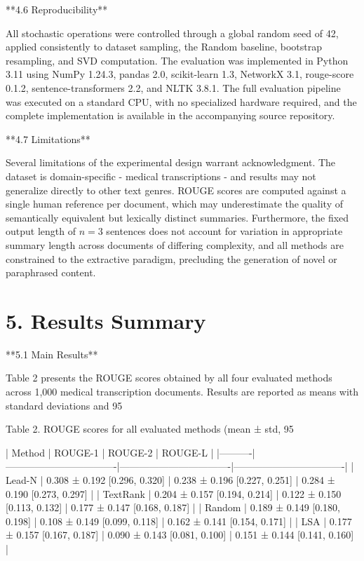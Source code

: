 \documentclass[10pt]{book}
\begin{document}
**4.6 Reproducibility**

All stochastic operations were controlled through a global random seed of 42, applied consistently to dataset sampling, the Random baseline, bootstrap resampling, and SVD computation. The evaluation was implemented in Python 3.11 using NumPy 1.24.3, pandas 2.0, scikit-learn 1.3, NetworkX 3.1, rouge-score 0.1.2, sentence-transformers 2.2, and NLTK 3.8.1. The full evaluation pipeline was executed on a standard CPU, with no specialized hardware required, and the complete implementation is available in the accompanying source repository.

**4.7 Limitations**

Several limitations of the experimental design warrant acknowledgment. The dataset is domain-specific - medical transcriptions - and results may not generalize directly to other text genres. ROUGE scores are computed against a single human reference per document, which may underestimate the quality of semantically equivalent but lexically distinct summaries. Furthermore, the fixed output length of $n=3$ sentences does not account for variation in appropriate summary length across documents of differing complexity, and all methods are constrained to the extractive paradigm, precluding the generation of novel or paraphrased content.


\section{5. Results Summary}

**5.1 Main Results**

Table 2 presents the ROUGE scores obtained by all four evaluated methods across 1,000 medical transcription documents. Results are reported as means with standard deviations and 95%

Table 2. ROUGE scores for all evaluated methods (mean ± std, 95%

| Method   | ROUGE-1                          | ROUGE-2                          | ROUGE-L                          |
|----------|----------------------------------|----------------------------------|----------------------------------|
| Lead-N   | 0.308 ± 0.192 [0.296, 0.320]    | 0.238 ± 0.196 [0.227, 0.251]    | 0.284 ± 0.190 [0.273, 0.297]    |
| TextRank | 0.204 ± 0.157 [0.194, 0.214]    | 0.122 ± 0.150 [0.113, 0.132]    | 0.177 ± 0.147 [0.168, 0.187]    |
| Random   | 0.189 ± 0.149 [0.180, 0.198]    | 0.108 ± 0.149 [0.099, 0.118]    | 0.162 ± 0.141 [0.154, 0.171]    |
| LSA      | 0.177 ± 0.157 [0.167, 0.187]    | 0.090 ± 0.143 [0.081, 0.100]    | 0.151 ± 0.144 [0.141, 0.160]    |
\end{document}
